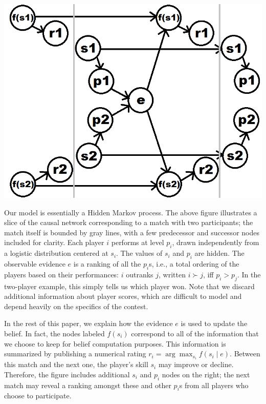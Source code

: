 \documentclass{article}
\begin{document}
\begin{center} \includegraphics[scale=0.35]{images/HMMlabeled.png} \end{center}

Our model is essentially a Hidden Markov process. The above figure illustrates a slice of the causal network corresponding to a match with two participants; the match itself is bounded by gray lines, with a few predecessor and successor nodes included for clarity. Each player $i$ performs at level $p_i$, drawn independently from a logistic distribution centered at $s_i$. The values of $s_i$ and $p_i$ are hidden. The observable evidence $e$ is a ranking of all the $p_i$s, i.e., a total ordering of the players based on their performances: $i$ outranks $j$, written $i \succ j$, iff $p_i > p_j$. In the two-player example, this simply tells us which player won. Note that we discard additional information about player scores, which are difficult to model and depend heavily on the specifics of the contest.

In the rest of this paper, we explain how the evidence $e$ is used to update the belief. In fact, the nodes labeled $f(s_i)$ correspond to all of the information that we choose to keep for belief computation purposes. This information is summarized by publishing a numerical rating $r_i = \arg\max_{s_i} f(s_i\mid e)$. Between this match and the next one, the player's skill $s_i$ may improve or decline. Therefore, the figure includes additional $s_i$ and $p_i$ nodes on the right; the next match may reveal a ranking amongst these and other $p_i$s from all players who choose to participate.
\end{document}
